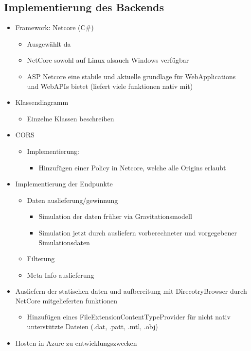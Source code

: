 \subsection{Implementierung des Backends}

\begin{itemize}
	\item Framework: Netcore (C\#)
	\begin{itemize}
		\item Ausgewählt da
		\item NetCore sowohl auf Linux alsauch Windows verfügbar
		\item ASP Netcore eine stabile und aktuelle grundlage für WebApplications und WebAPIs bietet (liefert viele funktionen nativ mit)
	\end{itemize}
	
	\item Klassendiagramm
	\begin{itemize}
		\item Einzelne Klassen beschreiben
	\end{itemize}
		
	\item CORS
	\begin{itemize}
		\item Implementierung:
		\begin{itemize}
			\item Hinzufügen einer Policy in Netcore, welche alle Origins erlaubt
		\end{itemize}
	\end{itemize}
	
	\item Implementierung der Endpunkte
	\begin{itemize}
		\item Daten auslieferung/gewinnung
		\begin{itemize}
			\item Simulation der daten früher via Gravitationsmodell
			\item Simulation jetzt durch ausliefern vorberechneter und vorgegebener Simulationsdaten
		\end{itemize}
				
		\item Filterung
		\item Meta Info auslieferung
	\end{itemize}
		
	\item Ausliefern der statischen daten und aufbereitung mit DirecotryBrowser durch NetCore mitgelieferten funktionen
	\begin{itemize}	
		\item Hinzufügen eines FileExtensionContentTypeProvider für nicht nativ unterstützte Dateien (.dat, .patt, .mtl, .obj)
	\end{itemize}
		
	\item Hosten in Azure zu entwicklungszwecken
\end{itemize}


